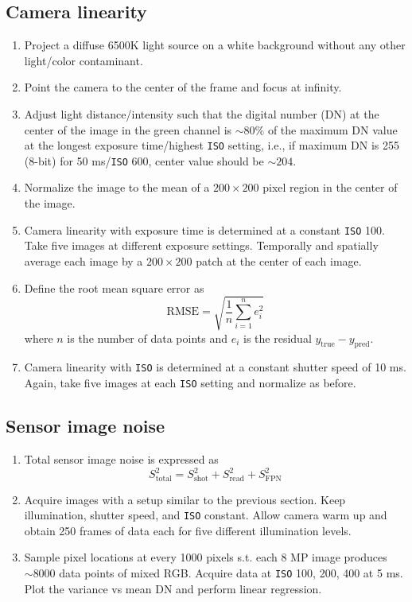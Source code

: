 \documentclass[12pt,a4paper]{article}
\begin{document}
\subsection{Camera linearity}
\begin{enumerate}
	\item Project a diffuse 6500K light source on a white background without any other light/color contaminant.
	\item Point the camera to the center of the frame and focus at infinity.
	\item Adjust light distance/intensity such that the digital number (DN) at the center of the image in the green channel is $\sim 80\%$ of the maximum DN value at the longest exposure time/highest \texttt{ISO} setting, i.e., if maximum DN is 255 (8-bit) for 50 ms/\texttt{ISO} 600, center value should be $\sim 204$.
	\item Normalize the image to the mean of a $200 \times 200$ pixel region in the center of the image.
	\item Camera linearity with exposure time is determined at a constant \texttt{ISO} 100. Take five images at different exposure settings. Temporally and spatially average each image by a $200 \times 200$ patch at the center of each image.
	\item Define the root mean square error as
		\begin{equation}
			\mathrm{RMSE} = \sqrt{\frac{1}{n} \sum_{i=1}^n e_i^2}
		\end{equation}
		where $n$ is the number of data points and $e_i$ is the residual $y_\mathrm{true} - y_\mathrm{pred}$.
	\item Camera linearity with \texttt{ISO} is determined at a constant shutter speed of 10 ms. Again, take five images at each \texttt{ISO} setting and normalize as before.
\end{enumerate}

\subsection{Sensor image noise}
\begin{enumerate}
	\item Total sensor image noise is expressed as
		\begin{equation}
			S_\mathrm{total}^2 = S_\mathrm{shot}^2 + S_\mathrm{read}^2 + S_\mathrm{FPN}^2
		\end{equation}
	\item Acquire images with a setup similar to the previous section. Keep illumination, shutter speed, and \texttt{ISO} constant. Allow camera warm up and obtain 250 frames of data each for five different illumination levels.
	\item Sample pixel locations at every 1000 pixels s.t. each 8 MP image produces $\sim 8000$ data points of mixed RGB. Acquire data at \texttt{ISO} 100, 200, 400 at 5 ms. Plot the variance vs mean DN and perform linear regression.
\end{enumerate}
\end{document}
